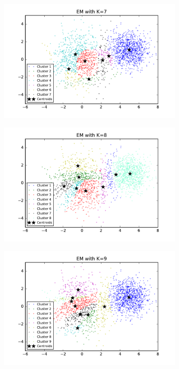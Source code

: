 \begin{figure}[htb]
\begin{subfigure}[b]{0.475\textwidth}
            \includegraphics[width=\textwidth]{./figures/clustering_EM_7.pdf}
        \end{subfigure}
        \hfill
        \begin{subfigure}[b]{0.475\textwidth}  
            \centering 
            \includegraphics[width=\textwidth]{./figures/clustering_EM_8.pdf}
        \end{subfigure}
        \begin{subfigure}[b]{0.475\textwidth}   
            \centering 
            \includegraphics[width=\textwidth]{./figures/clustering_EM_9.pdf}

\end{subfigure}
\end{figure}
